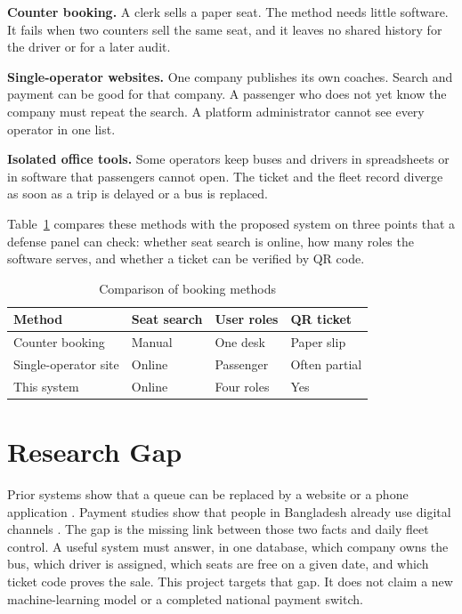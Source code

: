 \documentclass[12pt,a4paper]{report}
\begin{document}
\textbf{Counter booking.} A clerk sells a paper seat. The method needs little software. It fails when two counters sell the same seat, and it leaves no shared history for the driver or for a later audit.

\textbf{Single-operator websites.} One company publishes its own coaches. Search and payment can be good for that company. A passenger who does not yet know the company must repeat the search. A platform administrator cannot see every operator in one list.

\textbf{Isolated office tools.} Some operators keep buses and drivers in spreadsheets or in software that passengers cannot open. The ticket and the fleet record diverge as soon as a trip is delayed or a bus is replaced.

Table~\ref{tab:methods} compares these methods with the proposed system on three points that a defense panel can check: whether seat search is online, how many roles the software serves, and whether a ticket can be verified by QR code.

\begin{table}[ht]
\centering
\caption{Comparison of booking methods}
\label{tab:methods}
\renewcommand{\arraystretch}{1.25}
\setlength{\arrayrulewidth}{0.6pt}
\begin{tabular}{|l|l|l|l|}
\hline
\textbf{Method} & \textbf{Seat search} & \textbf{User roles} & \textbf{QR ticket} \\
\hline
Counter booking & Manual & One desk & Paper slip \\
\hline
Single-operator site & Online & Passenger & Often partial \\
\hline
This system & Online & Four roles & Yes \\
\hline
\end{tabular}
\end{table}

\section{Research Gap}
Prior systems show that a queue can be replaced by a website or a phone application \cite{ghara2022,fitriani2017}. Payment studies show that people in Bangladesh already use digital channels \cite{das2024,azam2023}. The gap is the missing link between those two facts and daily fleet control. A useful system must answer, in one database, which company owns the bus, which driver is assigned, which seats are free on a given date, and which ticket code proves the sale. This project targets that gap. It does not claim a new machine-learning model or a completed national payment switch.
\end{document}
